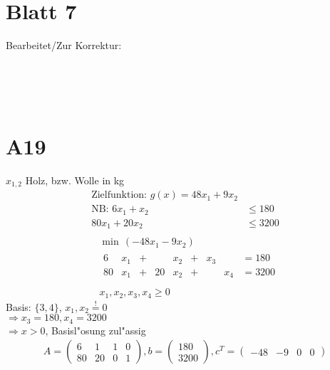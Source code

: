 \documentclass[fleqn,12pt]{scrartcl}
\newcommand{\blattn}{Blatt 7}
\begin{document}
\section*{\blattn}
Bearbeitet/Zur Korrektur:

\noindent
\begin{Form}
	\\
	\\
	\\
\end{Form}

\section{A19}
$x_{1,2}$ Holz, bzw. Wolle in kg
\begin{align*}
	\text{Zielfunktion: } g(x) = 48 x_1 + 9 x_2\\
	\text{NB: }  
	6x_1 + x_2 &\leq 180 \\
						  80 x_1 + 20 x_2 &\leq 3200\\
\end{align*}
\begin{align*}
	&\min\, (-48 x_1 - 9x_2)\\
 &\begin{array}{lllllllll}
	6&x_1 &+ &&x_2 &+ &x_3 & \quad &= 180\\
	80&x_1 &+ &20&x_2 &+ &  &x_4 &= 3200\\
\end{array}\\
	&x_1, x_2, x_3, x_4 \geq 0
\end{align*}
Basis: $\{3, 4\}$, $x_1, x_2 \overset != 0$\\
$\Rightarrow x_3 = 180, x_4 = 3200$\\
$\Rightarrow x > 0$, Basisl"osung zul"assig
\begin{align*}
	A = \begin{pmatrix}
		6 & 1 & 1 & 0\\
		80 & 20 & 0 & 1
	\end{pmatrix}, b = \begin{pmatrix}
	180\\ 3200 \end{pmatrix}, c^T = \begin{pmatrix} -48 & -9 & 0 & 0 \end{pmatrix}
\end{align*}
\end{document}
